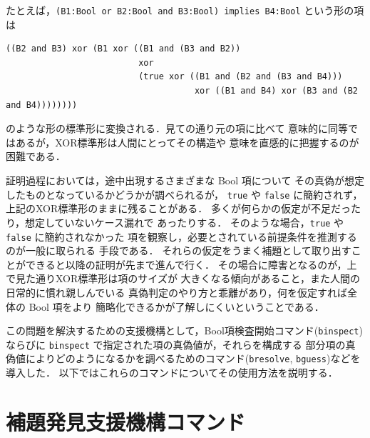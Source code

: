 \documentclass[a4paper,oneside,10pt,here]{memoir}
\begin{document}
たとえば，\verb|(B1:Bool or B2:Bool and B3:Bool) implies B4:Bool| という形の項は
\begin{verbatim}
((B2 and B3) xor (B1 xor ((B1 and (B3 and B2)) 
                          xor 
                          (true xor ((B1 and (B2 and (B3 and B4))) 
                                     xor ((B1 and B4) xor (B3 and (B2 and B4))))))))
\end{verbatim}
のような形の標準形に変換される．見ての通り元の項に比べて
意味的に同等ではあるが，XOR標準形は人間にとってその構造や
意味を直感的に把握するのが困難である．

証明過程においては，途中出現するさまざまな Bool 項について
その真偽が想定したものとなっているかどうかが調べられるが，
\verb|true| や \verb|false| に簡約されず，
上記のXOR標準形のままに残ることがある．
多くが何らかの仮定が不足だったり，想定していないケース漏れで
あったりする．
そのような場合，\verb|true| や \verb|false| に簡約されなかった
項を観察し，必要とされている前提条件を推測するのが一般に取られる
手段である．
それらの仮定をうまく補題として取り出すことができると以降の証明が先まで進んで行く．
その場合に障害となるのが，上で見た通りXOR標準形は項のサイズが
大きくなる傾向があること，また人間の日常的に慣れ親しんでいる
真偽判定のやり方と乖離があり，何を仮定すれば全体の Bool 項をより
簡略化できるかが了解しにくいということである．

この問題を解決するための支援機構として，Bool項検査開始コマンド(\verb|binspect|)
ならびに \verb|binspect| で指定された項の真偽値が，それらを構成する
部分項の真偽値によりどのようになるかを調べるためのコマンド(\verb|bresolve|, 
\verb|bguess|)などを導入した．
以下ではこれらのコマンドについてその使用方法を説明する．

\chapter{補題発見支援機構コマンド}
\end{document}
